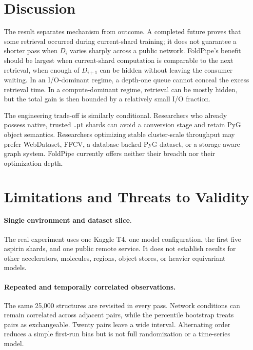 \documentclass[10pt]{article}
\begin{document}
\section{Discussion}

The result separates mechanism from outcome.  A completed future proves that
some retrieval occurred during current-shard training; it does not guarantee a
shorter pass when $D_i$ varies sharply across a public network.  FoldPipe's
benefit should be largest when current-shard computation is comparable to the
next retrieval, when enough of $D_{i+1}$ can be hidden without leaving the
consumer waiting.  In an I/O-dominant regime, a depth-one queue cannot conceal
the excess retrieval time.  In a compute-dominant regime, retrieval can be
mostly hidden, but the total gain is then bounded by a relatively small I/O
fraction.

The engineering trade-off is similarly conditional.  Researchers who already
possess native, trusted \texttt{.pt} shards can avoid a conversion stage and
retain PyG object semantics.  Researchers optimizing stable cluster-scale
throughput may prefer WebDataset, FFCV, a database-backed PyG dataset, or a
storage-aware graph system.  FoldPipe currently offers neither their breadth
nor their optimization depth.

\section{Limitations and Threats to Validity}

\paragraph{Single environment and dataset slice.}
The real experiment uses one Kaggle T4, one model configuration, the first five
aspirin shards, and one public remote service.  It does not establish results
for other accelerators, molecules, regions, object stores, or heavier
equivariant models.

\paragraph{Repeated and temporally correlated observations.}
The same 25,000 structures are revisited in every pass.  Network conditions can
remain correlated across adjacent pairs, while the percentile bootstrap treats
pairs as exchangeable.  Twenty pairs leave a wide interval.  Alternating order
reduces a simple first-run bias but is not full randomization or a time-series
model.
\end{document}
